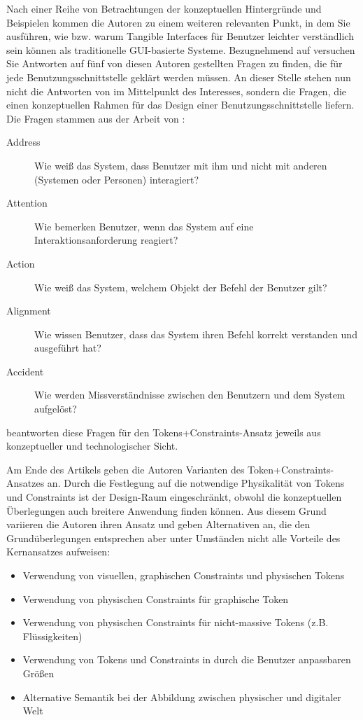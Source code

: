 Nach einer Reihe von Betrachtungen der konzeptuellen Hintergründe und Beispielen kommen die Autoren zu einem weiteren relevanten Punkt, in dem Sie ausführen, wie bzw. warum Tangible Interfaces für Benutzer leichter verständlich sein können als traditionelle \gls{GUI}-basierte Systeme. Bezugnehmend auf \citet{Bellotti02} versuchen Sie Antworten auf fünf von diesen Autoren gestellten Fragen zu finden, die für jede Benutzungsschnittstelle geklärt werden müssen. An dieser Stelle stehen nun nicht die Antworten von \citeauthor{Ullmer05} im Mittelpunkt des Interesses, sondern die Fragen, die einen konzeptuellen Rahmen für das Design einer Benutzungsschnittstelle liefern. Die Fragen stammen aus der Arbeit von \citet{Bellotti02}:
\begin{description}
	\item[Address] Wie weiß das System, dass Benutzer mit ihm und nicht mit anderen (Systemen oder Personen) interagiert?
	\item[Attention] Wie bemerken Benutzer, wenn das System auf eine Interaktionsanforderung reagiert? 
	\item[Action] Wie weiß das System, welchem Objekt der Befehl der Benutzer gilt?
	\item[Alignment] Wie wissen Benutzer, dass das System ihren Befehl korrekt verstanden und ausgeführt hat?
	\item[Accident] Wie werden Missverständnisse zwischen den Benutzern und dem System aufgelöst?
\end{description}
\citeauthor{Ullmer05} beantworten diese Fragen für den Tokens+Constraints-Ansatz jeweils aus konzeptueller und technologischer Sicht. 

Am Ende des Artikels geben die Autoren Varianten des Token+Constraints-Ansatzes an. Durch die Festlegung auf die notwendige Physikalität von Tokens und Constraints ist der Design-Raum eingeschränkt, obwohl die konzeptuellen Überlegungen auch breitere Anwendung finden können. Aus diesem Grund variieren die Autoren ihren Ansatz und geben Alternativen an, die den Grundüberlegungen entsprechen aber unter Umständen nicht alle Vorteile des Kernansatzes aufweisen:
\begin{itemize}
	\item Verwendung von visuellen, graphischen Constraints und physischen Tokens
	\item Verwendung von physischen Constraints für graphische Token
	\item Verwendung von physischen Constraints für nicht-massive Tokens (z.B. Flüssigkeiten)
	\item Verwendung von Tokens und Constraints in durch die Benutzer anpassbaren Größen
	\item Alternative Semantik bei der Abbildung zwischen physischer und digitaler Welt
\end{itemize}

